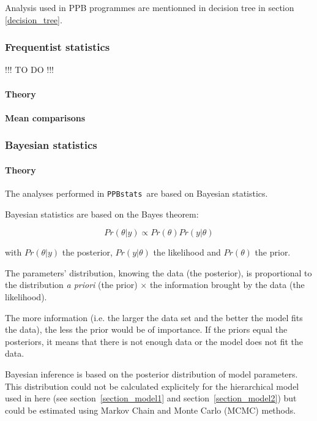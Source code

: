 \documentclass{book}\usepackage[]{graphicx}\usepackage[]{color}
\newcommand{\pack}{\texttt{PPBstats}}
\begin{document}
\noindent Analysis used in PPB programmes are mentionned in decision tree in section \ref{decision_tree}.


\subsubsection{Frequentist statistics}

!!! TO DO !!!

\paragraph{Theory}


\paragraph{Mean comparisons}


\subsubsection{Bayesian statistics}
\label{section_bayes}

\paragraph{Theory}

The analyses performed in \pack~are based on Bayesian statistics.

Bayesian statistics are based on the Bayes theorem:

\begin{displaymath}
Pr(\theta|y) \propto Pr(\theta) Pr(y|\theta)
\end{displaymath}

with
$Pr(\theta|y)$ the posterior,
$Pr(y|\theta)$ the likelihood and
$Pr(\theta)$ the prior.

The parameters' distribution, knowing the data (the posterior), is proportional to the distribution \textit{a  priori} (the prior) $\times$ the information brought by the data (the likelihood).

The more information (i.e. the larger the data set and the better the model fits the data), the less the prior would be of importance.
If the priors equal the posteriors, it means that there is not enough data or the model does not fit the data.


Bayesian inference is based on the posterior distribution of model parameters.
This distribution could not be calculated explicitely for the hierarchical model used in here (see section~\ref{section_model1} and section~\ref{section_model2}) but could be estimated using Markov Chain and Monte Carlo (MCMC) methods.
\end{document}
